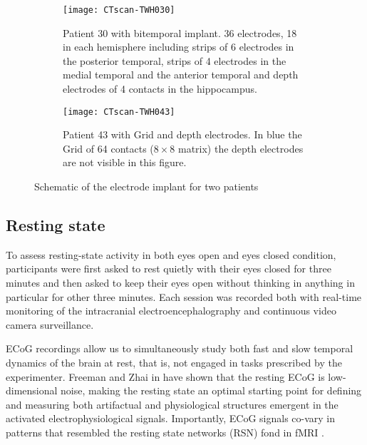 \documentclass[11pt, onecolumn]{article}
\begin{document}
\begin{figure}[ht] 
  \begin{subfigure}[t]{0.5\linewidth}
    \centering
    \texttt{[image: CTscan-TWH030]} 
    \caption{Patient 30 with bitemporal implant. 36 electrodes, 18 in each hemisphere including strips of 6 electrodes in the posterior temporal, strips of 4 electrodes in the medial temporal and the anterior temporal and depth electrodes of 4 contacts in the hippocampus.} 
    \label{fig0:a} 
    \vspace{4ex}
  \end{subfigure}%
  \hspace{1ex}
  \begin{subfigure}[t]{0.5\linewidth}
    \centering
    \texttt{[image: CTscan-TWH043]} 
    \caption{Patient 43 with Grid and depth electrodes. In blue the Grid of 64 contacts ($8 \times 8$ matrix) the depth electrodes are not visible in this figure.} 
    \label{fig0:b} 
    \vspace{4ex}
  \end{subfigure} 
  \caption{Schematic of the electrode implant for two patients}
  \label{fig0} 
\end{figure}

\subsection{Resting state}
To assess resting-state activity in both eyes open and eyes closed condition, participants were first asked to rest quietly with their eyes closed for three minutes and then asked to keep their eyes open without thinking in anything in particular for other three minutes. Each session was recorded both with real-time monitoring of the intracranial electroencephalography and continuous video camera surveillance.

ECoG recordings allow us to simultaneously study both fast and slow temporal dynamics of the brain at rest, that is, not engaged in tasks prescribed by the experimenter.
Freeman and Zhai in \citep{freeman2009simulated} have shown that the resting ECoG is low-dimensional noise, making the resting state an optimal starting point for defining and measuring both artifactual and physiological structures emergent in the activated electrophysiological signals. Importantly, ECoG signals co-vary in patterns that resembled the resting state networks (RSN) fond in fMRI  \citep{fukushima2015studying}.
\end{document}
